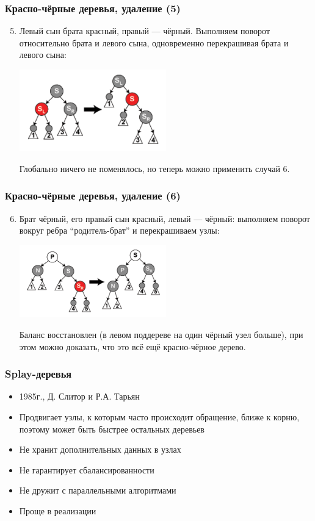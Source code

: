\documentclass[xetex,mathserif,serif]{beamer}
\begin{document}
	\begin{frame}
		\frametitle{Красно-чёрные деревья, удаление (5)}
		\begin{enumerate}
			\setcounter{enumi}{4}
			\item Левый сын брата красный, правый --- чёрный. Выполняем поворот относительно брата и левого сына, одновременно перекрашивая брата и левого сына:
			\begin{center}
				\includegraphics[width=0.5\textwidth]{deletion-from-red-black-tree4.png}
			\end{center}
			Глобально ничего не поменялось, но теперь можно применить случай 6.
		\end{enumerate}
	\end{frame}

	\begin{frame}
		\frametitle{Красно-чёрные деревья, удаление (6)}
		\begin{enumerate}
			\setcounter{enumi}{5}
			\item Брат чёрный, его правый сын красный, левый --- чёрный: выполняем поворот вокруг ребра ``родитель-брат'' и перекрашиваем узлы:
			\begin{center}
				\includegraphics[width=0.5\textwidth]{deletion-from-red-black-tree5.png}
			\end{center}
			Баланс восстановлен (в левом поддереве на один чёрный узел больше), при этом можно доказать, что это всё ещё красно-чёрное дерево.
		\end{enumerate}
	\end{frame}

	\begin{frame}
		\frametitle{Splay-деревья}
		\begin{itemize}
			\item 1985г., Д. Слитор и Р.А. Тарьян
			\item Продвигает узлы, к которым часто происходит обращение, ближе к корню, поэтому может быть быстрее остальных деревьев
			\item Не хранит дополнительных данных в узлах
			\item Не гарантирует сбалансированности
			\item Не дружит с параллельными алгоритмами
			\item Проще в реализации
		\end{itemize}
	\end{frame}
\end{document}
